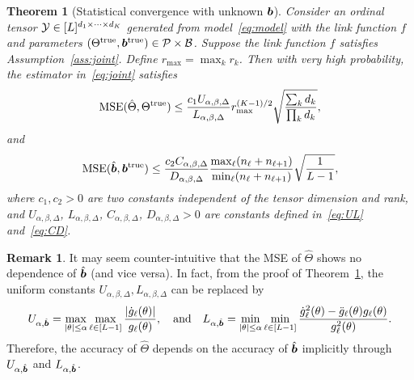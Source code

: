 \documentclass[11pt]{article}
\theoremstyle{plain}
\newtheorem{thm}{Theorem}[section]
\theoremstyle{definition}
\newtheorem{rmk}{Remark}
\begin{document}
\begin{thm}[Statistical convergence with unknown $\bm{b}$]\label{thm:ratejoint}
Consider an ordinal tensor $\mathcal{Y}\in[L]^{d_1\times \cdots \times d_K}$ generated from model~\eqref{eq:model} with the link function $f$ and parameters $(\Theta^{\mathrm{true}}, \bm{b}^{\mathrm{true}})\in\mathcal{P}\times \mathcal{B}$. Suppose the link function $f$ satisfies Assumption~\ref{ass:joint}. Define $r_{\max}=\max_k r_k$. Then with very high probability, the estimator in~\eqref{eq:joint} satisfies
\[
\text{MSE}(\hat \Theta, \Theta^{\mathrm{true}})\leq {c_1U_{\alpha,\beta,\Delta}\over L_{\alpha,\beta,\Delta}} r_{\max}^{(K-1)/2}  \sqrt{ \sum_k d_k \over \prod_k d_k},
\]
and
\[
\text{MSE}(\hat{\bm{b}}, \bm{b}^{\mathrm{true}}) \leq  {c_2 C_{\alpha,\beta,\Delta} \over D_{\alpha,\beta,\Delta}}{\max_{\ell}(n_\ell+n_{\ell+1})\over \min_{\ell}(n_{\ell}+n_{\ell+1})}  \sqrt{1\over L-1},
\]
where $c_1,c_2>0$ are two constants independent of the tensor dimension and rank, and $U_{\alpha,\beta,\Delta}$, $L_{\alpha,\beta,\Delta}$, $C_{\alpha,\beta,\Delta}$, $D_{\alpha,\beta,\Delta}>0$ are constants defined in~\eqref{eq:UL} and~\eqref{eq:CD}.
\end{thm}

\begin{rmk} It may seem counter-intuitive that the MSE of $\hat \Theta$ shows no dependence of $\hat {\bm{b}}$ (and vice versa). In fact, from the proof of Theorem~\ref{thm:ratejoint}, the uniform constants $U_{\alpha,\beta,\Delta}, L_{\alpha,\beta,\Delta}$ can be replaced by
\[
U_{\alpha,\hat {\bm{b}}}=\max_{|\theta|\leq \alpha}\max_{\ell\in[L-1]}{|\dot{g}_\ell(\theta)|\over g_\ell(\theta)},\quad \text{and}\quad L_{\alpha,\hat {\bm{b}}}=\min_{|\theta|\leq \alpha}\min_{\ell\in[L-1]} {\dot{g}^2_\ell(\theta)-\ddot{g}_\ell(\theta)g_\ell(\theta)\over g^2_\ell(\theta)}.
\]
Therefore, the accuracy of $\hat \Theta$ depends on the accuracy of $\hat {\bm{b}}$ implicitly through $U_{\alpha, \hat {\bm{b}}}$ and $ L_{\alpha,\hat {\bm{b}}}$. 

\end{rmk}
\end{document}
